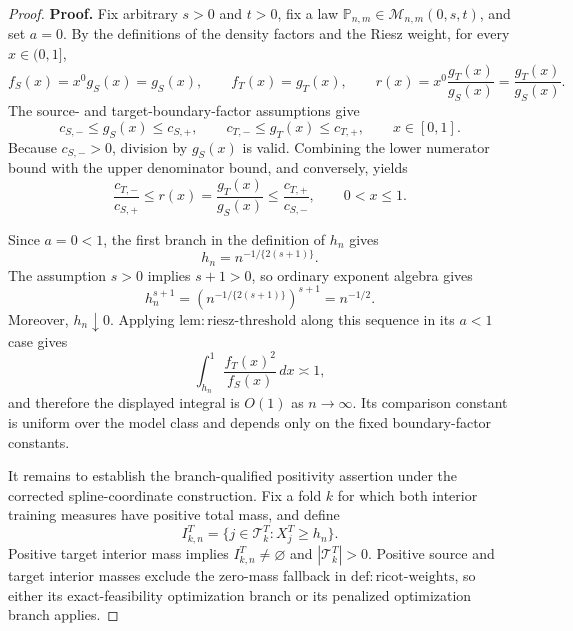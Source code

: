 \documentclass{article}
\begin{document}
\begin{proof}
\textbf{Proof.}
Fix arbitrary \(s>0\) and \(t>0\), fix a law \(\mathbb P_{n,m}\in\mathcal M_{n,m}(0,s,t)\), and set \(a=0\). By the definitions of the density factors and the Riesz weight, for every \(x\in(0,1]\),
\[
f_S(x)=x^0g_S(x)=g_S(x),\qquad
f_T(x)=g_T(x),\qquad
r(x)=x^0\frac{g_T(x)}{g_S(x)}=\frac{g_T(x)}{g_S(x)}.
\tag{1}
\]
The source- and target-boundary-factor assumptions give
\[
c_{S,-}\le g_S(x)\le c_{S,+},
\qquad
c_{T,-}\le g_T(x)\le c_{T,+},
\qquad x\in[0,1].
\tag{2}
\]
Because \(c_{S,-}>0\), division by \(g_S(x)\) is valid. Combining the lower numerator bound with the upper denominator bound, and conversely, yields
\[
\frac{c_{T,-}}{c_{S,+}}
\le r(x)=\frac{g_T(x)}{g_S(x)}
\le \frac{c_{T,+}}{c_{S,-}},
\qquad 0<x\le1.
\tag{3}
\]

Since \(a=0<1\), the first branch in the definition of \(h_n\) gives
\[
h_n=n^{-1/\{2(s+1)\}}.
\tag{4}
\]
The assumption \(s>0\) implies \(s+1>0\), so ordinary exponent algebra gives
\[
h_n^{s+1}
=\left(n^{-1/\{2(s+1)\}}\right)^{s+1}
=n^{-1/2}.
\tag{5}
\]
Moreover, \(h_n\downarrow0\). Applying \(\mathrm{lem:riesz\text{-}threshold}\) along this sequence in its \(a<1\) case gives
\[
\int_{h_n}^1\frac{f_T(x)^2}{f_S(x)}\,dx\asymp1,
\tag{6}
\]
and therefore the displayed integral is \(O(1)\) as \(n\to\infty\). Its comparison constant is uniform over the model class and depends only on the fixed boundary-factor constants.

It remains to establish the branch-qualified positivity assertion under the corrected spline-coordinate construction. Fix a fold \(k\) for which both interior training measures have positive total mass, and define
\[
I^T_{k,n}=\{j\in\mathcal T^T_k:X_j^T\ge h_n\}.
\tag{7}
\]
Positive target interior mass implies \(I^T_{k,n}\ne\varnothing\) and \(|\mathcal T^T_k|>0\). Positive source and target interior masses exclude the zero-mass fallback in \(\mathrm{def:ricot\text{-}weights}\), so either its exact-feasibility optimization branch or its penalized optimization branch applies.


\end{proof}
\end{document}

